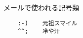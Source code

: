 \documentclass{jlreq}
\begin{document}
メールで使われる記号類
\begin{verbatim}
    :-)    元祖スマイル
    ^^;    冷や汗
\end{verbatim}
\end{document}
